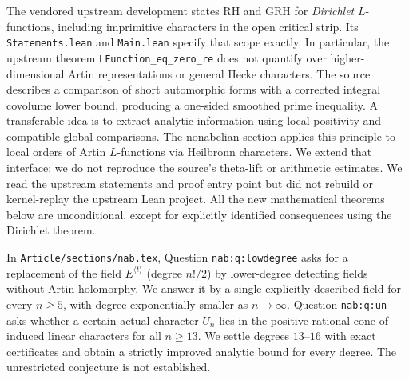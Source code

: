 \documentclass[11pt]{article}
\theoremstyle{remark}\newtheorem{remark}[theorem]{Remark}
\begin{document}
The vendored upstream development \cite{upstream} states RH and GRH for \emph{Dirichlet} $L$-functions, including imprimitive characters in the open critical strip. Its \texttt{Statements.lean} and \texttt{Main.lean} specify that scope exactly. In particular, the upstream theorem \texttt{LFunction\_eq\_zero\_re} does not quantify over higher-dimensional Artin representations or general Hecke characters. The source describes a comparison of short automorphic forms with a corrected integral covolume lower bound, producing a one-sided smoothed prime inequality. A transferable idea is to extract analytic information using local positivity and compatible global comparisons. The nonabelian section applies this principle to local orders of Artin $L$-functions via Heilbronn characters. We extend that interface; we do not reproduce the source's theta-lift or arithmetic estimates. We read the upstream statements and proof entry point but did not rebuild or kernel-replay the upstream Lean project. All the new mathematical theorems below are unconditional, except for explicitly identified consequences using the Dirichlet theorem.

In \texttt{Article/sections/nab.tex}, Question \texttt{nab:q:lowdegree} asks for a replacement of the field $E^{\langle t\rangle}$ (degree $n!/2$) by lower-degree detecting fields without Artin holomorphy. We answer it by a single explicitly described field for every $n\ge5$, with degree exponentially smaller as $n\to\infty$. Question \texttt{nab:q:un} asks whether a certain actual character $U_n$ lies in the positive rational cone of induced linear characters for all $n\ge13$. We settle degrees $13$--$16$ with exact certificates and obtain a strictly improved analytic bound for every degree. The unrestricted conjecture is not established.
\end{document}
